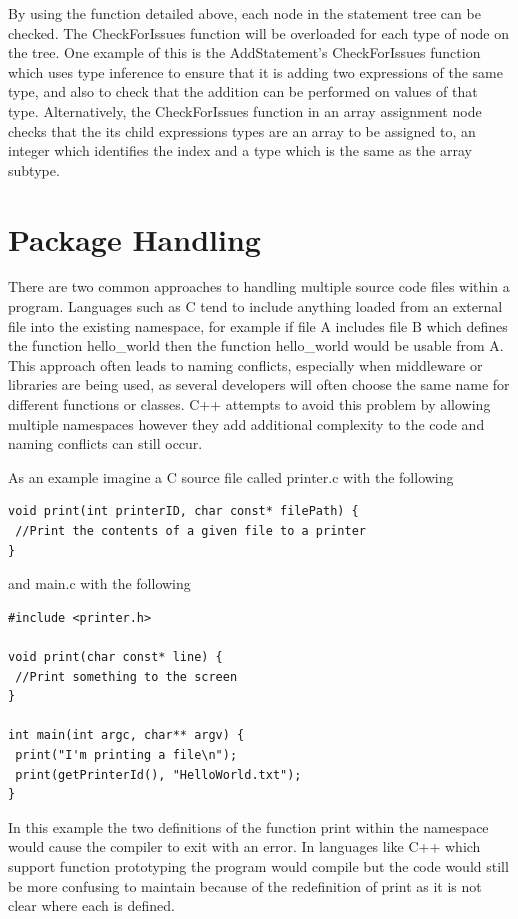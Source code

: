 \documentclass[]{final_report}
\begin{document}
By using the function detailed above, each node in the statement tree can be checked. The CheckForIssues function will be overloaded for each type of node on the tree. One example of this is the AddStatement's CheckForIssues function which uses type inference to ensure that it is adding two expressions of the same type, and also to check that the addition can be performed on values of that type. Alternatively, the CheckForIssues function in an array assignment node checks that the its child expressions types are an array to be assigned to, an integer which identifies the index and a type which is the same as the array subtype.

\chapter{Package Handling}

There are two common approaches to handling multiple source code files within a program. Languages such as C tend to include anything loaded from an external file into the existing namespace, for example if file A includes file B which defines the function hello\_world then the function hello\_world would be usable from A. This approach often leads to naming conflicts, especially when middleware or libraries are being used, as several developers will often choose the same name for different functions or classes. C++ attempts to avoid this problem by allowing multiple namespaces however they add additional complexity to the code and naming conflicts can still occur.

As an example imagine a C source file called printer.c with the following

\begin{verbatim}
void print(int printerID, char const* filePath) {
 //Print the contents of a given file to a printer
}
\end{verbatim}

and main.c with the following
\begin{verbatim}
#include <printer.h>

void print(char const* line) {
 //Print something to the screen
}

int main(int argc, char** argv) {
 print("I'm printing a file\n");
 print(getPrinterId(), "HelloWorld.txt");
}
\end{verbatim}

In this example the two definitions of the function print within the namespace would cause the compiler to exit with an error. In languages like C++ which support function prototyping the program would compile but the code would still be more confusing to maintain because of the redefinition of print as it is not clear where each is defined.
\end{document}

